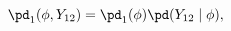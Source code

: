 \begin{equation}
  \pd_{1}(\phi, Y_{12}) = \pd_{1}(\phi)\pd(Y_{12} \mid \phi),
  \label{eqn:study-12-submodel}
\end{equation}
